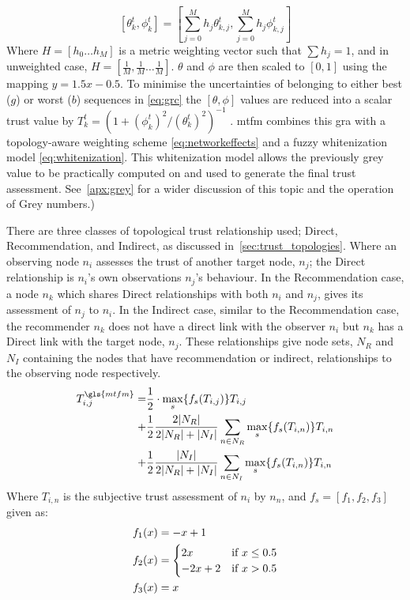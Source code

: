 %
\begin{equation}
  \label{eq:metric_weighting}
  [\theta_k^t, \phi_k^t] = \left[\sum_{j=0}^M h_j \theta_{k,j}^t,\sum_{j=0}^M h_j \phi_{k,j}^t \right]
\end{equation}
%
Where $H=[h_0\dots h_M]$ is a metric weighting vector such that $\sum h_j = 1$, and in unweighted case, $H=[\frac{1}{M},\frac{1}{M}\dots\frac{1}{M}]$.
$\theta$ and $\phi$ are then scaled to $[0,1]$ using the mapping $y = 1.5 x - 0.5$.
To minimise the uncertainties of belonging to either best ($g$) or worst ($b$) sequences in \eqref{eq:grc} the $[\theta,\phi]$ values are reduced into a scalar trust value by $T_k^t = ({1+{(\phi_k^t)^2}/{(\theta_k^t)^2}})^{-1}$ \cite{Hong2010}.
\gls{mtfm} combines this \gls{gra} with a topology-aware weighting scheme \eqref{eq:networkeffects} and a fuzzy whitenization model \eqref{eq:whitenization}.
This whitenization model allows the previously grey value to be practically computed on and used to generate the final trust assessment\cite{Liu2011}. See~\autoref{apx:grey} for a wider discussion of this topic and the operation of Grey numbers.)

There are three classes of topological trust relationship used; Direct, Recommendation, and Indirect, as discussed in~\autoref{sec:trust_topologies}.
Where an observing node $n_i$ assesses the trust of another target node, $n_j$; the Direct relationship is $n_i$'s own observations $n_j$'s behaviour.
In the Recommendation case, a node $n_k$ which shares Direct relationships with both $n_i$ and $n_j$, gives its assessment of $n_j$ to $n_i$.
In the Indirect case, similar to the Recommendation case, the recommender $n_k$ does not have a direct link with the observer $n_i$ but $n_k$ has a Direct link with the target node, $n_j$.
These relationships give node sets, $N_R$ and $N_I$ containing the nodes that have recommendation or indirect, relationships to the observing node respectively.
%
\begin{align}
  \label{eq:networkeffects}
  T_{i,j}^{\gls{mtfm}}=&\frac{1}{2} \cdot \max_s\{f_s(T_{i,j})\} T_{i,j}\\ \notag
  +&\frac{1}{2} \frac{2|N_R| }{2|N_R| + |N_I|}\sum_{n \in N_R} \max_s\{f_s(T_{i,n})\} T_{i,n}\\ \notag
  +&\frac{1}{2} \frac{|N_I| }{2|N_R| + |N_I|}\sum_{n \in N_I} \max_s\{f_s(T_{i,n})\} T_{i,n} 
\end{align}
Where $T_{i,n}$ is the subjective trust assessment of $n_i$ by $n_n$, and $f_s = [ f_1,f_2, f_3]$ given as:
\begin{align}
  \label{eq:whitenization}
  f_1(x)&= -x+1\notag\\
  f_2(x)&= 
  \begin{cases}
    2x & \text{if }x\leq 0.5\\
    -2x+2 & \text{if }x>0.5
  \end{cases}\\
  f_3(x)&= x\notag
\end{align}
%

